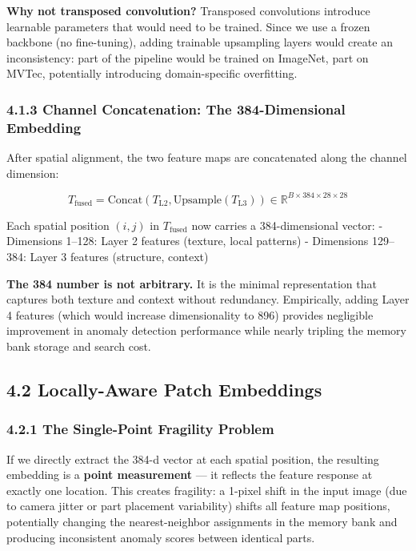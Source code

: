 \documentclass[12pt, a4paper, oneside]{report}
\begin{document}
\textbf{Why not transposed convolution?} Transposed convolutions introduce learnable parameters that would need to be trained. Since we use a frozen backbone (no fine-tuning), adding trainable upsampling layers would create an inconsistency: part of the pipeline would be trained on ImageNet, part on MVTec, potentially introducing domain-specific overfitting.

\subsubsection{4.1.3 Channel Concatenation: The 384-Dimensional Embedding}\label{channel-concatenation-the-384-dimensional-embedding}

After spatial alignment, the two feature maps are concatenated along the channel dimension:

\[T_{\text{fused}} = \text{Concat}(T_{\text{L2}}, \text{Upsample}(T_{\text{L3}})) \in \mathbb{R}^{B \times 384 \times 28 \times 28}\]

Each spatial position \((i, j)\) in \(T_{\text{fused}}\) now carries a 384-dimensional vector: - Dimensions 1--128: Layer 2 features (texture, local patterns) - Dimensions 129--384: Layer 3 features (structure, context)

\textbf{The 384 number is not arbitrary.} It is the minimal representation that captures both texture and context without redundancy. Empirically, adding Layer 4 features (which would increase dimensionality to 896) provides negligible improvement in anomaly detection performance while nearly tripling the memory bank storage and search cost.

\bigskip\noindent\hrulefill\bigskip

\subsection{4.2 Locally-Aware Patch Embeddings}\label{locally-aware-patch-embeddings}

\subsubsection{4.2.1 The Single-Point Fragility Problem}\label{the-single-point-fragility-problem}

If we directly extract the 384-d vector at each spatial position, the resulting embedding is a \textbf{point measurement} --- it reflects the feature response at exactly one location. This creates fragility: a 1-pixel shift in the input image (due to camera jitter or part placement variability) shifts all feature map positions, potentially changing the nearest-neighbor assignments in the memory bank and producing inconsistent anomaly scores between identical parts.
\end{document}
